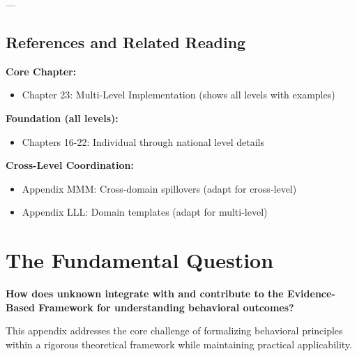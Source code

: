 ---


\subsection*{References and Related Reading}

\textbf{Core Chapter:}
\begin{itemize}[nosep]
\item Chapter 23: Multi-Level Implementation (shows all levels with examples)
\end{itemize}

\textbf{Foundation (all levels):}
\begin{itemize}[nosep]
\item Chapters 16-22: Individual through national level details
\end{itemize}

\textbf{Cross-Level Coordination:}
\begin{itemize}[nosep]
\item Appendix MMM: Cross-domain spillovers (adapt for cross-level)
\item Appendix LLL: Domain templates (adapt for multi-level)
\end{itemize}



\section{The Fundamental Question}
\label{sec:nnn-fundamental}

\begin{tcolorbox}[
    colback=red!5!white,
    colframe=red!75!black,
    title={\textbf{Fundamental Question}}
]
\textbf{How does unknown integrate with and contribute to the
Evidence-Based Framework for understanding behavioral outcomes?}

This appendix addresses the core challenge of formalizing behavioral principles
within a rigorous theoretical framework while maintaining practical applicability.
\end{tcolorbox}


